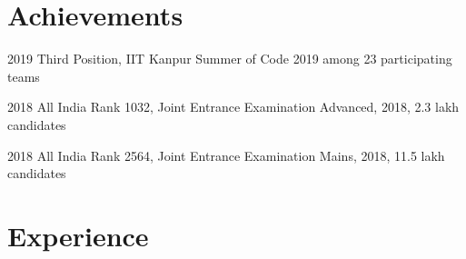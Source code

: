 \documentclass[]{style}          %
\begin{document}

\section{Achievements}

\begin{entrylist}
\entry
{2019}
{Third Position, {\normalfont IIT Kanpur Summer of Code 2019 among 23 participating teams}}


\end{entrylist}
\begin{entrylist}
\entry
{2018}
{All India Rank 1032, {\normalfont Joint Entrance Examination Advanced, 2018, 2.3 lakh candidates}}


\end{entrylist}
\begin{entrylist}
\entry
{2018}
{All India Rank 2564, {\normalfont Joint Entrance Examination Mains, 2018, 11.5 lakh candidates}}



\end{entrylist}
{\vspace{-0.5cm}}



\section{Experience}
\end{document}
